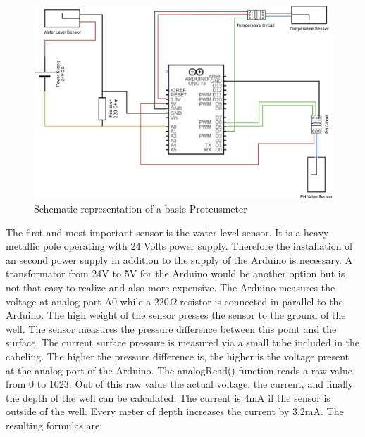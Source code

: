 \documentclass[11pt, letterpaper]{article}
\begin{document}
\begin{figure}[ht!]
	\centering
	\includegraphics[width=160mm]{figures/Circuit.jpg}
	\caption{Schematic representation of a basic Proteusmeter \label{schematic_Proteusmeter}}
\end{figure}
\newline

The first and most important sensor is the water level sensor. It is a heavy metallic pole operating with 24 Volts power supply. Therefore the installation of an second power supply in addition to the supply of the Arduino is necessary. A transformator from 24V to 5V for the Arduino would be another option but is not that easy to realize and also more expensive. The Arduino measures the voltage at analog port A0 while a 220$\Omega$ resistor is connected in parallel to the Arduino. The high weight of the sensor presses the sensor to the ground of the well. The sensor measures the pressure difference between this point and the surface. The current surface pressure is measured via a small tube included in the cabeling. The higher the pressure difference is, the higher is the voltage present at the analog port of the Arduino. The analogRead()-function reads a raw value from 0 to 1023. Out of this raw value the actual voltage, the current, and finally the depth of the well can be calculated. The current is 4mA if the sensor is outside of the well. Every meter of depth increases the current by 3.2mA. The resulting formulas are:
\newline
\end{document}
